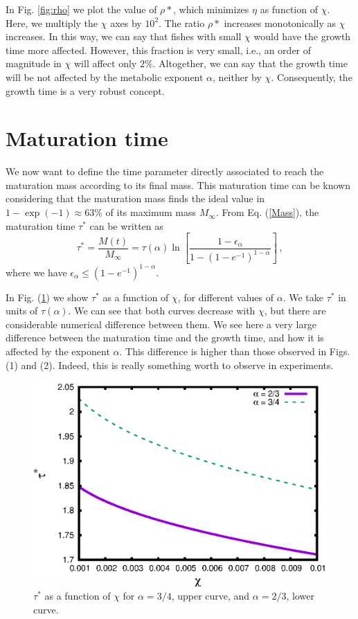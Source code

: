 \documentclass[12pt]{iopart}
\begin{document}
In Fig. \ref{fig:rho} we plot the value of $\rho*$, which minimizes $\eta$ as function of $\chi$.
Here, we multiply the $\chi$ axes by $10^{2}$.  The ratio $\rho*$ increases monotonically
as $\chi$ increases. In this way, we can say that fishes with small $\chi$ would have the growth
time more affected. However, this fraction is very small, i.e., an order of magnitude in $\chi$ will affect only $2\%$. Altogether, we can say that the growth time will be not affected by the metabolic exponent $\alpha$, neither by $\chi$. Consequently, the growth time is a very robust concept.

\section{Maturation time}

We now want to define the time parameter directly associated to reach the maturation mass according to its final mass. This maturation time can be known considering that the maturation mass finds the ideal value in $1-\exp{(-1)} \approx 63 \% $ of its maximum mass $M_{\infty}$. From Eq. (\ref{Mass}), the maturation time $\tau^*$ can be written as
\begin{equation}
\label{matu}
\tau^* =\frac{M(t)}{M_{\infty}}=\tau(\alpha) \ln{\left[\frac{1-\epsilon_{\alpha}}{1-(1-e^{-1})^{1-\alpha}}\right]}\,,
\end{equation}
where we have $\epsilon_{\alpha} \leq (1-e^{-1})^{1-\alpha}$.

In Fig. (\ref{fig:tau2}) we show $\tau^*$ as a function of $\chi$, for different values of $\alpha$. We take $\tau^*$ in units of $\tau(\alpha)$. We can see that both  curves decrease with $\chi$, but there are considerable numerical difference between them.
We see here a very large difference between the maturation time and the growth time, and how it is affected by the exponent $\alpha$.
This difference is higher than those observed in Figs. (1) and (2). Indeed, this is really something worth to observe in experiments.
\begin{figure}%
\centering
\includegraphics[width=.7\columnwidth]{figure_3}%
\caption{ $\tau^*$ as a function of $\chi$ for $\alpha = 3/4$, upper curve, and $\alpha = 2/3$, lower curve.}%
\label{fig:tau2}%
\end{figure}
\end{document}
